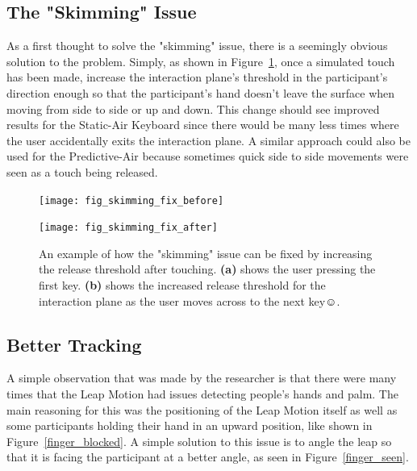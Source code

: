 \subsection{The "Skimming" Issue}
As a first thought to solve the "skimming" issue, there is a seemingly obvious solution to the problem. Simply, as shown in Figure~\ref{skimming_problem_fix}, once a simulated touch has been made, increase the interaction plane's threshold in the participant's direction enough so that the participant's hand doesn't leave the surface when moving from side to side or up and down. This change should see improved results for the Static-Air Keyboard since there would be many less times where the user accidentally exits the interaction plane. A similar approach could also be used for the Predictive-Air because sometimes quick side to side movements were seen as a touch being released.

\begin{figure}[h]
	\centering
	\begin{minipage}[t]{2.5in}
		\texttt{[image: fig\_skimming\_fix\_before]}
	\end{minipage}
	\begin{minipage}[t]{2.5in}
		\texttt{[image: fig\_skimming\_fix\_after]}
	\end{minipage}
	\caption[Skimming Solution]{An example of how the "skimming" issue can be fixed by increasing the release threshold after touching. \textbf{(a)} shows the user pressing the first key. \textbf{(b)} shows the increased release threshold for the interaction plane as the user moves across to the next key☺.}
	\label{skimming_problem_fix}
\end{figure}

\subsection{Better Tracking}
A simple observation that was made by the researcher is that there were many times that the Leap Motion had issues detecting people's hands and palm. The main reasoning for this was the positioning of the Leap Motion itself as well as some participants holding their hand in an upward position, like shown in Figure~\ref{finger_blocked}. A simple solution to this issue is to angle the leap so that it is facing the participant at a better angle, as seen in Figure~\ref{finger_seen}.

